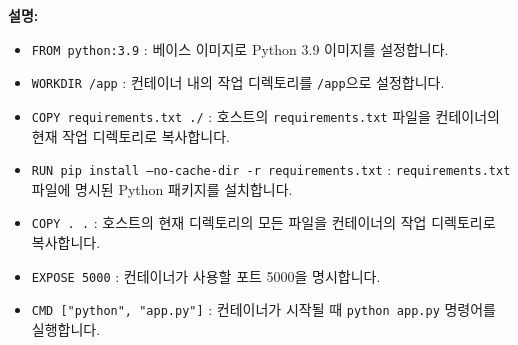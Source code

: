 \documentclass{article}
\begin{document}
  \textbf{설명:}
  \begin{itemize}
    \item \texttt{FROM python:3.9} : 베이스 이미지로 Python 3.9 이미지를 설정합니다.
    \item \texttt{WORKDIR /app} : 컨테이너 내의 작업 디렉토리를 \texttt{/app}으로 설정합니다.
    \item \texttt{COPY requirements.txt ./} : 호스트의 \texttt{requirements.txt} 파일을 컨테이너의 현재 작업 디렉토리로 복사합니다.
    \item \texttt{RUN pip install --no-cache-dir -r requirements.txt} : \texttt{requirements.txt} 파일에 명시된 Python 패키지를 설치합니다.
    \item \texttt{COPY . .} : 호스트의 현재 디렉토리의 모든 파일을 컨테이너의 작업 디렉토리로 복사합니다.
    \item \texttt{EXPOSE 5000} : 컨테이너가 사용할 포트 5000을 명시합니다.
    \item \texttt{CMD ["python", "app.py"]} : 컨테이너가 시작될 때 \texttt{python app.py} 명령어를 실행합니다.
  \end{itemize}
  
\end{document}
